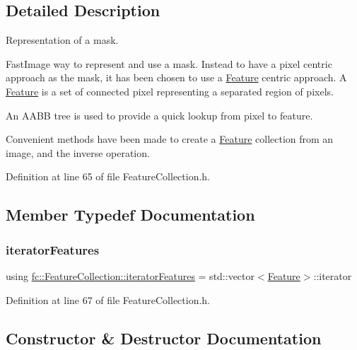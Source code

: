 \subsection{Detailed Description}
Representation of a mask. 

Fast\+Image way to represent and use a mask. Instead to have a pixel centric approach as the mask, it has been chosen to use a \hyperlink{classfc_1_1Feature}{Feature} centric approach. A \hyperlink{classfc_1_1Feature}{Feature} is a set of connected pixel representing a separated region of pixels.

An A\+A\+BB tree is used to provide a quick lookup from pixel to feature.

Convenient methods have been made to create a \hyperlink{classfc_1_1Feature}{Feature} collection from an image, and the inverse operation. 

Definition at line 65 of file Feature\+Collection.\+h.



\subsection{Member Typedef Documentation}
\mbox{\label{classfc_1_1FeatureCollection_a947efbbe893a14c47d2d5e535a0e9429}} 
\subsubsection{\texorpdfstring{iterator\+Features}{iteratorFeatures}}
{\footnotesize\ttfamily using \hyperlink{classfc_1_1FeatureCollection_a947efbbe893a14c47d2d5e535a0e9429}{fc\+::\+Feature\+Collection\+::iterator\+Features} =  std\+::vector$<$\hyperlink{classfc_1_1Feature}{Feature}$>$\+::iterator}



Definition at line 67 of file Feature\+Collection.\+h.



\subsection{Constructor \& Destructor Documentation}
\mbox{\label{classfc_1_1FeatureCollection_ab2e7399b460e0c12fc12cd289a1c14ed}} 
